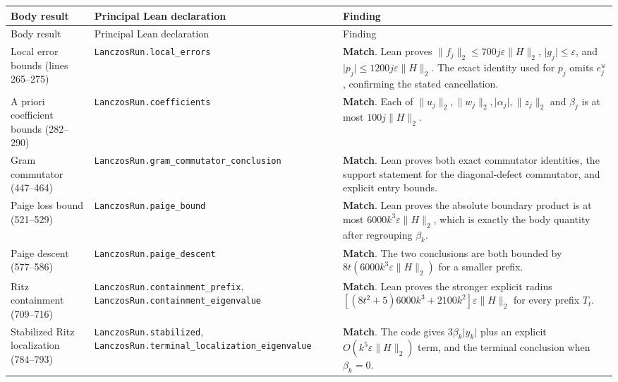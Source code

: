 \documentclass[11pt]{article}
\newcommand{\norm}[1]{\lVert #1\rVert_2}
\newcommand{\abs}[1]{\lvert #1\rvert}
\newcommand{\eps}{\varepsilon}
\newcommand{\lean}[1]{\nolinkurl{#1}}
\newcommand{\match}{\textcolor{ok}{\textbf{Match}}}
\begin{document}
\renewcommand{\arraystretch}{1.16}
\begin{longtable}{@{}>{\raggedright\arraybackslash}p{}
                    >{\raggedright\arraybackslash}p{}
                    >{\raggedright\arraybackslash}p{}@{}}
\toprule
Body result & Principal Lean declaration & Finding \\
\midrule
\endfirsthead
\toprule
Body result & Principal Lean declaration & Finding \\
\midrule
\endhead
\bottomrule
\endfoot

Local error bounds (lines 265--275)
& \lean{LanczosRun.local\_errors}
& \match.  Lean proves
$\norm{f_j}\le700j\eps\norm H$, $\abs{g_j}\le\eps$, and
$\abs{p_j}\le1200j\eps\norm H$.  The exact identity used for $p_j$ omits
$e^u_j$, confirming the stated cancellation. \\

A priori coefficient bounds (282--290)
& \lean{LanczosRun.coefficients}
& \match.  Each of $\norm{u_j},\norm{w_j},\abs{\alpha_j},\norm{z_j}$ and
$\beta_j$ is at most $100j\norm H$. \\

Gram commutator (447--464)
& \lean{LanczosRun.gram\_commutator\_conclusion}
& \match.  Lean proves both exact commutator identities, the support statement
for the diagonal-defect commutator, and explicit entry bounds. \\

Paige loss bound (521--529)
& \lean{LanczosRun.paige\_bound}
& \match.  Lean proves the absolute boundary product is at most
$6000k^3\eps\norm H$, which is exactly the body quantity after regrouping
$\beta_k$. \\

Paige descent (577--586)
& \lean{LanczosRun.paige\_descent}
& \match.  The two conclusions are both bounded by
$8t(6000k^3\eps\norm H)$ for a smaller prefix. \\

Ritz containment (709--716)
& \lean{LanczosRun.containment\_prefix},
\lean{LanczosRun.containment\_eigenvalue}
& \match.  Lean proves the stronger explicit radius
$[(8t^2+5)6000k^3+2100k^2]\eps\norm H$ for every prefix $T_t$. \\

Stabilized Ritz localization (784--793)
& \lean{LanczosRun.stabilized},
\lean{LanczosRun.terminal\_localization\_eigenvalue}
& \match.  The code gives
$3\beta_k\abs{y_k}$ plus an explicit $O(k^5\eps\norm H)$ term, and the
terminal conclusion when $\beta_k=0$. \\


\end{longtable}
\end{document}
